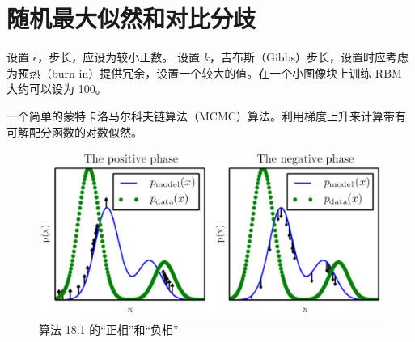 \section{随机最大似然和对比分歧}
\label{sec:18.2}

\begin{algorithm}
\DontPrintSemicolon
设置 \(\epsilon\)，步长，应设为较小正数。\;
设置 \(k\)，吉布斯（Gibbs）步长，设置时应考虑为预热（burn in）提供冗余，设置一个较大的值。在一个小图像块上训练 RBM 大约可以设为 100。\;
\caption{一个简单的蒙特卡洛马尔科夫链算法（MCMC）算法。利用梯度上升来计算带有可解配分函数的对数似然。\label{alg:18.1}}
\end{algorithm}

\begin{figure}[htbp] %
   \centering
   \includegraphics[width=\textwidth]{fig/chap18/18_1.png} 
   \caption{算法 18.1 的``正相''和``负相''}
   \label{fig:18.1}
\end{figure}

